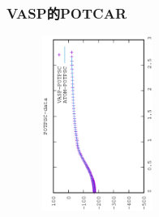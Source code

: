 \frame
{
	\frametitle{\rm{VASP}的\rm{POTCAR}}
\begin{minipage}{0.58\textwidth}
\centering
\vspace{-0.10in}
\fontsize{3.3pt}{1.9pt}\selectfont{
}
\end{minipage}
\hfill
\begin{minipage}{0.40\textwidth}
\begin{figure}[t!]
\centering
\vspace{-0.05in}
\includegraphics[height=2.25in,width=1.5in,viewport=0 0 350 550, angle=-90, clip]{Figures/POTPSC-data.eps}
\label{Pseudopotential-core_Function}
\end{figure}
\end{minipage}
}


